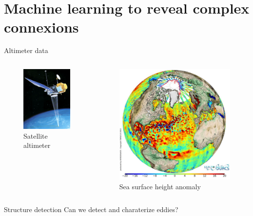 \documentclass[handout]{beamer}
\begin{document}
\section{Machine learning to reveal complex connexions}
\begin{frame}{Altimeter data}
\begin{columns}[t]
    \begin{figure}
        \centering
        \caption*{Satellite altimeter}
         \includegraphics[width=.6\textwidth]{fig/L3/TOPEX-Poseidon.png}
    \end{figure}
    

    \begin{figure}
        \centering
        \caption*{Sea surface height anomaly}
         \includegraphics[width=.9\textwidth]{fig/L3/eddies.png}
    \end{figure}

    \end{columns}
    \begin{block}{Structure detection}
    Can we detect and charaterize eddies?
    \end{block}
\end{frame}
\end{document}
